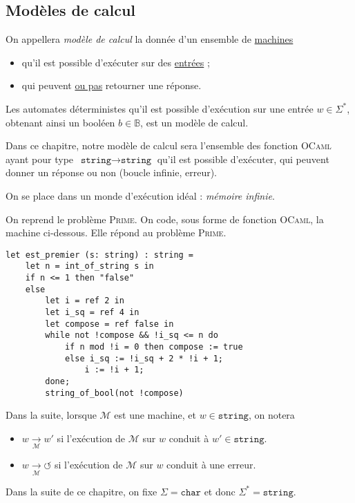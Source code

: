 \subsection{Modèles de calcul}

\begin{defn}
	On appellera \textit{modèle de calcul} la donnée d'un ensemble de \ul{machines}
	\begin{itemize}
		\item qu'il est possible d'exécuter sur des \ul{entrées} ;
		\item qui peuvent \ul{ou pas} retourner une réponse.
	\end{itemize}
\end{defn}

\begin{exm}
	Les automates déterministes qu'il est possible d'exécution sur une entrée $w \in \Sigma^*$, obtenant ainsi un booléen $b \in \mathds{B}$, est un modèle de calcul. 
\end{exm}

Dans ce chapitre, notre modèle de calcul sera l'ensemble des fonction \textsc{OCaml} ayant pour type~$\texttt{string} \to \texttt{string}$ qu'il est possible d'exécuter, qui peuvent donner un réponse ou non (boucle infinie, erreur).

\begin{rmk}
	On se place dans un monde d'exécution idéal : \textit{mémoire infinie}.
\end{rmk}

\begin{exm}
	On reprend le problème \textsc{Prime}. On code, sous forme de fonction \textsc{OCaml}, la machine ci-dessous. Elle répond au problème \textsc{Prime}.
	\begin{lstlisting}[language=caml,caption={Machine décidant le problème \textsc{Prime}}]
let est_premier (s: string) : string =
	let n = int_of_string s in
	if n <= 1 then "false"
	else
		let i = ref 2 in
		let i_sq = ref 4 in
		let compose = ref false in
		while not !compose && !i_sq <= n do
			if n mod !i = 0 then compose := true
			else i_sq := !i_sq + 2 * !i + 1;
				i := !i + 1;
		done;
		string_of_bool(not !compose)
	\end{lstlisting}
\end{exm}

\begin{rmk}[Notation]
	Dans la suite, lorsque $\mathcal{M}$\/ est une machine, et $w \in \texttt{string}$, on notera
	\begin{itemize}
		\item $w \xrightarrow[\mathcal{M}]{} w'$ si l'exécution de $\mathcal{M}$\/ sur $w$\/ conduit à $w' \in \texttt{string}$.
		\item $w \xrightarrow[\mathcal{M}]{} {\circlearrowleft}$\/
			si l'exécution de $\mathcal{M}$\/ sur $w$\/ conduit à une erreur.
	\end{itemize}
	Dans la suite de ce chapitre, on fixe $\Sigma = \texttt{char}$\/ et donc $\Sigma^* = \texttt{string}$.
\end{rmk}

